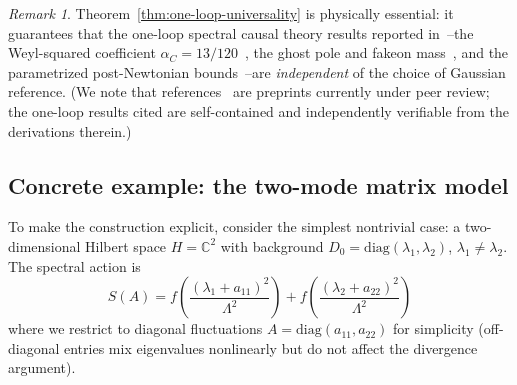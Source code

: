 \documentclass[12pt,a4paper]{article}
\theoremstyle{plain}
\theoremstyle{definition}
\theoremstyle{remark}
\newtheorem{remark}[theorem]{Remark}
\newcommand{\Lam}{\Lambda}
\begin{document}
\begin{remark}\label{rem:universality-consequence}
Theorem~\ref{thm:one-loop-universality} is physically essential: it
guarantees that the one-loop spectral causal theory results
reported in~\cite{Alfyorov:2026ff,Alfyorov:2026ss,Alfyorov:2026ct}--the
Weyl-squared coefficient $\alpha_C =
13/120$~\cite{Alfyorov:2026ff}, the ghost pole and fakeon
mass~\cite{AlfyorovShnyukov:2026ns}, and the parametrized
post-Newtonian bounds~\cite{Alfyorov:2026ss}--are
\emph{independent} of the choice of Gaussian reference.
(We note that references~\cite{Alfyorov:2026ff,Alfyorov:2026ss,%
AlfyorovShnyukov:2026ns} are preprints currently under peer review;
the one-loop results cited are self-contained and independently
verifiable from the derivations therein.)
\end{remark}

\subsection{Concrete example: the two-mode matrix model}
\label{subsec:example}

To make the construction explicit, consider the simplest nontrivial
case: a two-dimensional Hilbert space $H = \mathbb{C}^2$ with
background $D_0 = \mathrm{diag}(\lambda_1, \lambda_2)$,
$\lambda_1 \ne \lambda_2$.  The spectral action is
\begin{equation}
  S(A) = f\!\left(\frac{(\lambda_1+a_{11})^2}{\Lam^2}\right)
       + f\!\left(\frac{(\lambda_2+a_{22})^2}{\Lam^2}\right)
\end{equation}
where we restrict to diagonal fluctuations
$A = \mathrm{diag}(a_{11}, a_{22})$ for simplicity (off-diagonal
entries mix eigenvalues nonlinearly but do not affect the divergence
argument).
\end{document}
